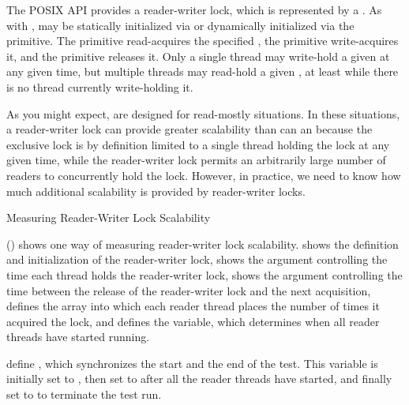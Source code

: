 The POSIX API provides a reader-writer lock, which is represented by
a .
As with ,  may be statically
initialized via  or dynamically
initialized via the  primitive.
The  primitive read-acquires the
specified , the 
primitive write-acquires it, and the 
primitive releases it.
Only a single thread may write-hold a given 
at any given time, but multiple threads may read-hold a given
, at least while there is no thread
currently write-holding it.

As you might expect,  are designed for read-mostly
situations.
In these situations, a reader-writer lock can provide greater scalability
than can an  because the exclusive lock is by definition
limited to a single thread holding the lock at any given time, while
the reader-writer lock permits
an arbitrarily large number of readers to concurrently hold the lock.
However, in practice, we need to know how much additional scalability is
provided by reader-writer locks.

\begin{listing}

\caption{Measuring Reader-Writer Lock Scalability}
\label{lst:toolsoftrade:Measuring Reader-Writer Lock Scalability}
\end{listing}

\begin{fcvref}
()
shows one way of measuring reader-writer lock scalability.
 shows the definition and initialization of the reader-writer
lock,  shows the  argument controlling the
time each thread holds the reader-writer lock,
 shows the  argument controlling the time between
the release of the reader-writer lock and the next acquisition,
 defines the  array into which each reader thread
places the number of times it acquired the lock, and
 defines the  variable, which
determines when all reader threads have started running.

 define ,
which synchronizes the start and the
end of the test.
This variable is initially set to , then set to
 after all the reader threads have started, and finally
set to  to terminate the test run.
\end{fcvref}

